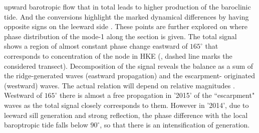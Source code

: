 \documentclass[12pt]{article}
\begin{document}
upward barotropic flow that in total leads to higher production of the baroclinic tide. And the  
conversions highlight the marked dynamical differences by having opposite signs on the leeward 
side . These points are further explored on  
where phase distribution of the mode-1 along the section is given. The total signal shows a region 
of almost constant phase change eastward of $165^{\circ}$ that corresponds to 
concentration of the node in HKE (, dashed line marks the considered 
transect). Decomposition of the signal 
reveals the balance as a sum of the ridge-generated waves (eastward propagation) and the escarpment-
originated (westward) waves. The actual relation will depend on relative magnitudes 
\citep{martini2007diagnosing}. 
Westward of $165^{\circ}$ there is almost a free propagation in '2015' of the ``escarpment" 
waves as the total signal closely corresponds to them. However in '2014', due to leeward sill 
generation 
and  
strong reflection, the phase difference with the local baroptropic tide falls below 
$90^{\circ}$, so that there is an intensification of generation.\\
\end{document}
